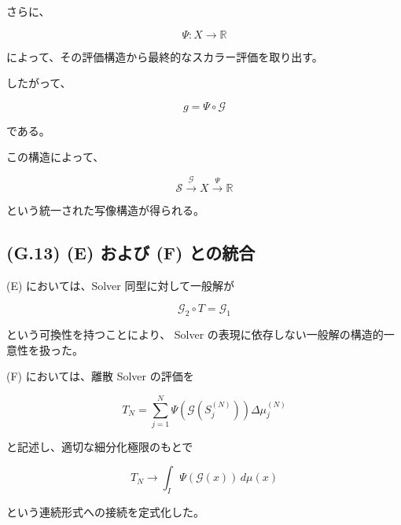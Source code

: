 \documentclass[a4paper,11pt]{article}
\begin{document}
さらに、

\begin{equation}
    \boxed{
        \Psi:
        X\longrightarrow\mathbb{R}
    }
\end{equation}

によって、その評価構造から最終的なスカラー評価を取り出す。

したがって、

\begin{equation}
    \boxed{
        g
        =
        \Psi\circ\mathcal{G}
    }
\end{equation}

である。

この構造によって、

\begin{equation}
    \boxed{
        \mathcal{S}
        \xrightarrow{\mathcal{G}}
        X
        \xrightarrow{\Psi}
        \mathbb{R}
    }
\end{equation}

という統一された写像構造が得られる。


\subsection{(G.13) (E) および (F) との統合}
\label{subsec:G13}

(E) においては、Solver 同型に対して一般解が

\begin{equation}
    \mathcal{G}_2\circ T
    =
    \mathcal{G}_1
\end{equation}

という可換性を持つことにより、
Solver の表現に依存しない一般解の構造的一意性を扱った。

(F) においては、離散 Solver の評価を

\begin{equation}
    T_N
    =
    \sum_{j=1}^{N}
    \Psi\!\left(
        \mathcal{G}\!\left(S_j^{(N)}\right)
    \right)
    \Delta\mu_j^{(N)}
\end{equation}

と記述し、適切な細分化極限のもとで

\begin{equation}
    T_N
    \longrightarrow
    \int_I
    \Psi\!\left(\mathcal{G}(x)\right)
    \,d\mu(x)
\end{equation}

という連続形式への接続を定式化した。
\end{document}
